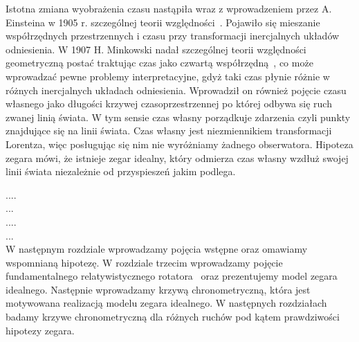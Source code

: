 Istotna zmiana wyobrażenia czasu nastąpiła wraz z wprowadzeniem przez 
A. Einsteina w 1905 r. szczególnej teorii względności~\cite{einstein}.
Pojawiło się mieszanie współrzędnych 
przestrzennych i czasu przy transformacji 
inercjalnych układów odniesienia.
W 1907 H. Minkowski nadał szczególnej teorii względności 
geometryczną postać traktując czas jako czwartą 
współrzędną~\cite{minkowski2013space}, co może 
wprowadzać pewne problemy interpretacyjne, gdyż taki 
czas płynie różnie w różnych inercjalnych 
układach odniesienia.
Wprowadził on również pojęcie czasu własnego jako długości 
krzywej czasoprzestrzennej po której odbywa się ruch zwanej linią świata.
W tym sensie czas własny porządkuje zdarzenia czyli punkty znajdujące
się na linii świata.
Czas własny jest niezmiennikiem transformacji Lorentza, 
więc posługując się
nim nie wyróżniamy żadnego obserwatora.
Hipoteza zegara
mówi, że istnieje zegar idealny, który odmierza czas własny 
wzdłuż swojej linii świata niezależnie od przyspieszeń 
jakim podlega.

....\\
...\\
....\\
...\\
W następnym rozdziale wprowadzamy pojęcia wstępne oraz omawiamy 
wspomnianą hipotezę. W rozdziale trzecim wprowadzamy pojęcie 
fundamentalnego relatywistycznego rotatora~\cite{star2008} oraz
prezentujemy model zegara idealnego. Następnie 
wprowadzamy krzywą chronometryczną, która jest motywowana 
realizacją modelu zegara idealnego.
W następnych rozdziałach badamy krzywe chronometryczną 
dla różnych ruchów pod kątem prawdziwości hipotezy zegara.
